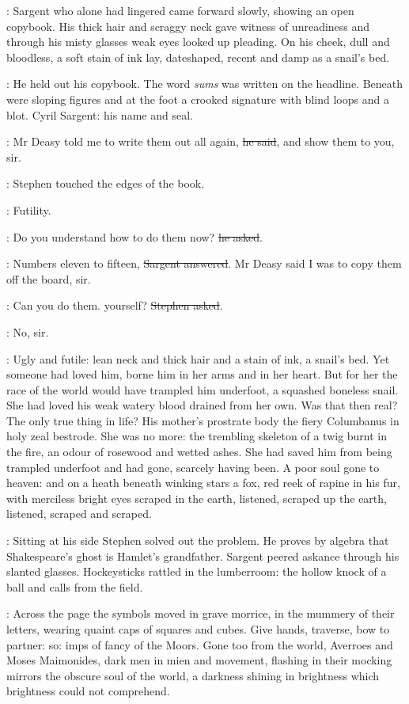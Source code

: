:
Sargent who alone had lingered
came forward slowly, showing an open copybook.
His thick hair and scraggy neck gave witness of unreadiness
and through his misty glasses weak eyes looked up pleading.
On his cheek, dull and bloodless,
a soft stain of ink lay, dateshaped,
recent and damp as a snail's bed.

:
He held out his copybook.
The word \emph{sums} was written on the headline.
Beneath were sloping figures
and at the foot a crooked signature with blind loops and a blot.
Cyril Sargent: his name and seal.

\sargent:
Mr Deasy told me to write them out all again, \sout{he said},
and show them to you, sir.

:
Stephen touched the edges of the book.

\StephenInt:
Futility.

\Stephen:
Do you understand how to do them now?
\sout{he asked}.

\sargent:
Numbers eleven to fifteen,
\sout{Sargent answered}.
Mr Deasy said I was to copy them off the board, sir.

\Stephen:
Can you do them. yourself?
\sout{Stephen asked}.

\sargent:
No, sir.

\StephenInt:
Ugly and futile:
lean neck and thick hair
and a stain of ink, a snail's bed.
Yet someone had loved him,
borne him in her arms and in her heart.
But for her the race of the world would have trampled him underfoot,
a squashed boneless snail.
She had loved his weak watery blood drained from her own.
Was that then real?
The only true thing in life?
His mother's prostrate body
the fiery Columbanus in holy zeal bestrode.
She was no more:
the trembling skeleton of a twig burnt in the fire,
an odour of rosewood and wetted ashes.
She had saved him from being trampled underfoot
and had gone, scarcely having been.
A poor soul gone to heaven:
and on a heath beneath winking stars
a fox, red reek of rapine in his fur,
with merciless bright eyes scraped in the earth,
listened, scraped up the earth,
listened, scraped and scraped.

:
Sitting at his side Stephen solved out the problem.
He proves by algebra that Shakespeare's ghost is Hamlet's grandfather.
Sargent peered askance through his slanted glasses.
Hockeysticks rattled in the lumberroom:
the hollow knock of a ball and calls from the field.

\StephenInt:
Across the page the symbols moved in grave morrice,
in the mummery of their letters,
wearing quaint caps of squares and cubes.
Give hands, traverse, bow to partner:
so:
imps of fancy of the Moors.
Gone too from the world,
Averroes and Moses Maimonides,
dark men in mien and movement,
flashing in their mocking mirrors the obscure soul of the world,
a darkness shining in brightness
which brightness could not comprehend.

